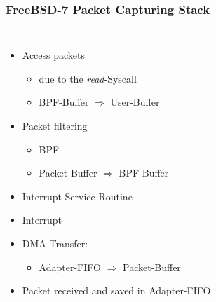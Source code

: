 \documentclass{beamer}
\begin{document}
\begin{frame}
\frametitle{FreeBSD-7 Packet Capturing Stack}
\begin{columns}
\vspace{0em}
\begin{itemize}
\item <7-> Access packets
	\begin{itemize}
		\item <7->due to the \emph{read}-Syscall
		\item <7->BPF-Buffer $\Rightarrow$ 	User-Buffer
	\end{itemize}
\item <5-> Packet filtering
	\begin{itemize}
		\item <5->BPF 
		\item <6->Packet-Buffer $\Rightarrow$ BPF-Buffer
	\end{itemize}
\item <4-> Interrupt Service Routine
\item <3-> Interrupt
\item <2-> DMA-Transfer:
	\begin{itemize}
		\item <2->Adapter-FIFO $\Rightarrow$ Packet-Buffer
	\end{itemize}
\item <1-> Packet received and saved in Adapter-FIFO
\end{itemize}
\vspace{-2em}
\begin{figure}

\end{figure}
\end{columns}
\end{frame}
\end{document}
